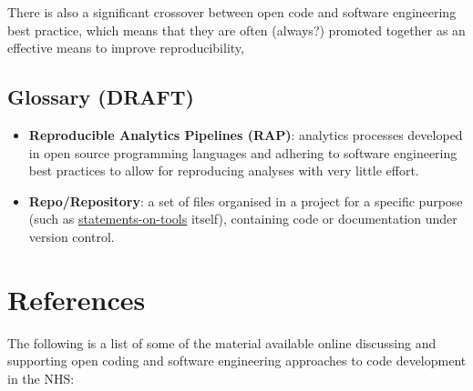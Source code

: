 \documentclass[
]{book}
\providecommand{\tightlist}{%
  \setlength{\itemsep}{0pt}\setlength{\parskip}{0pt}}
\begin{document}
There is also a significant crossover between open code and software engineering best practice, which means that they are often (always?) promoted together as an effective means to improve reproducibility,

\hypertarget{glossary-draft}{%
\subsection{Glossary (DRAFT)}\label{glossary-draft}}

\begin{itemize}
\tightlist
\item
  \textbf{Reproducible Analytics Pipelines (RAP)}: analytics processes developed in open source programming languages and adhering to software engineering best practices to allow for reproducing analyses with very little effort.
\item
  \textbf{Repo/Repository}: a set of files organised in a project for a specific purpose (such as \href{https://github.com/nhs-r-community/statements-on-tools}{statements-on-tools} itself), containing code or documentation under version control.
\end{itemize}

\hypertarget{references}{%
\section{References}\label{references}}

The following is a list of some of the material available online discussing and supporting open coding and software engineering approaches to code development in the NHS:
\end{document}
